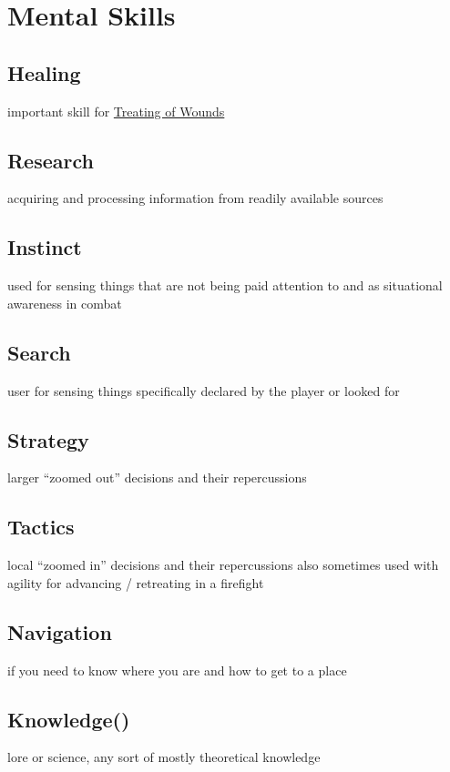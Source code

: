 \section{Mental Skills}\label{sec:wisdom-skills}
\subsection{Healing}\label{subsec:healing-skill}
important skill for \hyperref[subsec:treatment]{Treating of Wounds}
\subsection{Research}\label{subsec:research}
acquiring and processing information from readily available sources
\subsection{Instinct}\label{subsec:instinct}
used for sensing things that are not being paid attention to and as situational awareness in combat
\subsection{Search}\label{subsec:search}
user for sensing things specifically declared by the player or looked for
\subsection{Strategy}\label{subsec:strategy}
larger ``zoomed out'' decisions and their repercussions
\subsection{Tactics}\label{subsec:tactics}
local ``zoomed in'' decisions and their repercussions
also sometimes used with agility for advancing / retreating in a firefight
\subsection{Navigation}\label{subsec:navigation}
if you need to know where you are and how to get to a place
\subsection{Knowledge()}\label{subsec:knowledge}
lore or science, any sort of mostly theoretical knowledge
